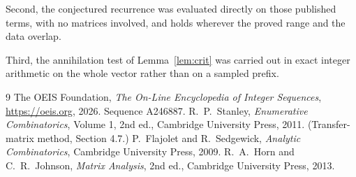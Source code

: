 \documentclass[11pt,a4paper]{article}
\theoremstyle{plain}
\theoremstyle{definition}
\begin{document}
Second, the conjectured recurrence was evaluated directly on those published terms, with no
matrices involved, and holds wherever the proved range and the data overlap.

Third, the annihilation test of Lemma~\ref{lem:crit} was carried out in exact integer
arithmetic on the whole vector rather than on a sampled prefix.

\begin{thebibliography}{9}
 The OEIS Foundation, \emph{The On-Line Encyclopedia of Integer
Sequences}, \url{https://oeis.org}, 2026. Sequence A246887.
 R.~P.~Stanley, \emph{Enumerative Combinatorics}, Volume 1, 2nd ed.,
Cambridge University Press, 2011. (Transfer-matrix method, Section 4.7.)
 P.~Flajolet and R.~Sedgewick, \emph{Analytic Combinatorics}, Cambridge
University Press, 2009.
 R.~A.~Horn and C.~R.~Johnson, \emph{Matrix Analysis}, 2nd ed., Cambridge
University Press, 2013.
\end{thebibliography}
\end{document}
